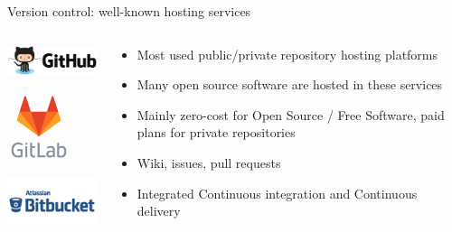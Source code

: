 \begin{frame}[fragile]{Version control: well-known hosting services}


\begin{columns}
\begin{column}{0.5\textwidth}
  \begin{center}
  \includegraphics[width=10em]{github-logo}

  \includegraphics[width=5em]{gitlab-logo}

  \includegraphics[width=10em]{bitbucket-logo}
  \end{center}
\end{column}
\begin{column}{0.5\textwidth}
  \begin{itemize}
    \item Most used public/private repository hosting platforms
    \item Many open source software are hosted in these services
    \item Mainly zero-cost for Open Source / Free Software, paid plans for private repositories
    \item Wiki, issues, pull requests
    \item Integrated Continuous integration and Continuous delivery
  \end{itemize}
\end{column}
\end{columns}

\end{frame}
